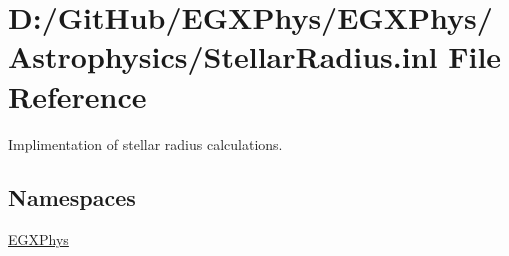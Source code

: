 \hypertarget{_stellar_radius_8inl}{}\section{D\+:/\+Git\+Hub/\+E\+G\+X\+Phys/\+E\+G\+X\+Phys/\+Astrophysics/\+Stellar\+Radius.inl File Reference}
\label{_stellar_radius_8inl}


Implimentation of stellar radius calculations.  


\subsection*{Namespaces}
\begin{DoxyCompactItemize}
\item 
 \mbox{\hyperlink{namespace_e_g_x_phys}{E\+G\+X\+Phys}}
\end{DoxyCompactItemize}
